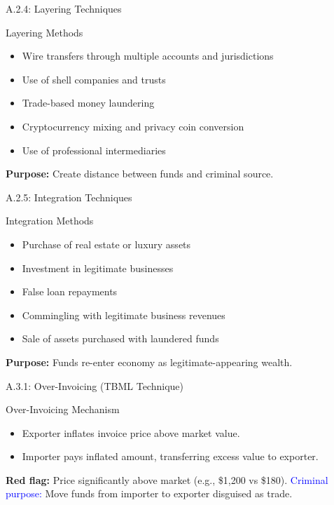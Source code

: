 \documentclass{beamer}
\begin{document}
	\begin{frame}{A.2.4: Layering Techniques}
		\begin{block}{Layering Methods}
			\begin{itemize}
				\item Wire transfers through multiple accounts and jurisdictions
				\item Use of shell companies and trusts
				\item Trade-based money laundering
				\item Cryptocurrency mixing and privacy coin conversion
				\item Use of professional intermediaries
			\end{itemize}
		\end{block}
		\textbf{Purpose:} Create distance between funds and criminal source.
	\end{frame}
	
	\begin{frame}{A.2.5: Integration Techniques}
		\begin{block}{Integration Methods}
			\begin{itemize}
				\item Purchase of real estate or luxury assets
				\item Investment in legitimate businesses
				\item False loan repayments
				\item Commingling with legitimate business revenues
				\item Sale of assets purchased with laundered funds
			\end{itemize}
		\end{block}
		\textbf{Purpose:} Funds re-enter economy as legitimate-appearing wealth.
	\end{frame}
	
	
	\begin{frame}{A.3.1: Over-Invoicing (TBML Technique)}
		\begin{block}{Over-Invoicing Mechanism}
			\begin{itemize}
				\item Exporter inflates invoice price above market value.
				\item Importer pays inflated amount, transferring excess value to exporter.
			\end{itemize}
		\end{block}
		\textbf{Red flag:} Price significantly above market (e.g., \$1,200 vs \$180).
		\textcolor{blue}{Criminal purpose:} Move funds from importer to exporter disguised as trade.
	\end{frame}
	
\end{document}
